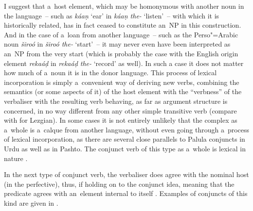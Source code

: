 I suggest that a~host element, which may be homonymous with another noun in the language~-- such as \textit{káaṇ} `ear' in \textit{káaṇ the-} `listen'~-- with which it is historically related, has in fact ceased to constitute an~NP in this construction. And in the case of a~loan from another language~-- such as the Perso"=Arabic noun \textit{široó} in \textit{široó the-} `start'~-- it may never even have been interpreted as an~NP from the very start (which is probably the case with the English origin element \textit{rekaáḍ} in \textit{rekaáḍ the-} `record' as well). In such a case it does not matter how much of a~noun it is in the donor language. This process of lexical incorporation \citep[203]{verma1993} is simply a~convenient way of deriving new verbs, combining the semantics (or some aspects of it) of the host element with the ``verbness'' of the verbaliser with the resulting verb behaving, as far as argument structure is concerned, in no way different from any other simple transitive verb (compare with \citealt[286]{haspelmath1993} for Lezgian). In some cases it is not entirely unlikely that the complex as a~whole is a~calque from another language, without even going through a~process of lexical incorporation, as there are several close parallels to Palula conjuncts in Urdu as well as in Pashto. The conjunct verb of this type as a~whole is lexical in nature \citep[199]{verma1993}.



 In the next type of conjunct verb, the verbaliser does agree with the nominal host (in the perfective), thus, if holding on to the conjunct idea, meaning that the predicate agrees with an~element internal to itself \citep[168]{mohanan1993}. Examples of conjuncts of this kind are given in .


